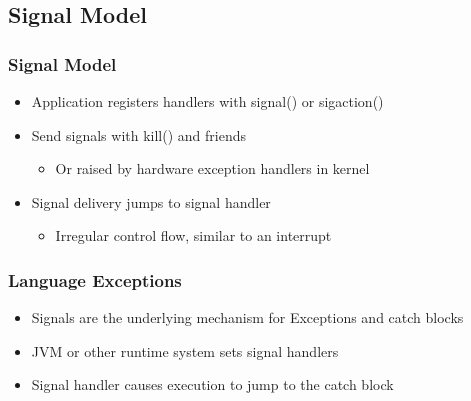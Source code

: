 \subsection{Signal Model} %
\begin{frame}[fragile]
    \frametitle{Signal Model}
    \begin{itemize}
        \item Application registers handlers with signal() or sigaction() \pause
        \item Send signals with kill() and friends
        \begin{itemize}
            \item Or raised by hardware exception handlers in kernel
        \end{itemize} \pause
        \item Signal delivery jumps to signal handler
        \begin{itemize}
            \item Irregular control flow, similar to an interrupt
        \end{itemize}
    \end{itemize}
\end{frame}
% 
% 
\begin{frame}[fragile]
    \frametitle{Language Exceptions}
    \begin{itemize}
        \item Signals are the underlying mechanism for Exceptions and catch blocks \pause
        \item JVM or other runtime system sets signal handlers \pause
        \item Signal handler causes execution to jump to the catch block
    \end{itemize}
\end{frame}
% 
